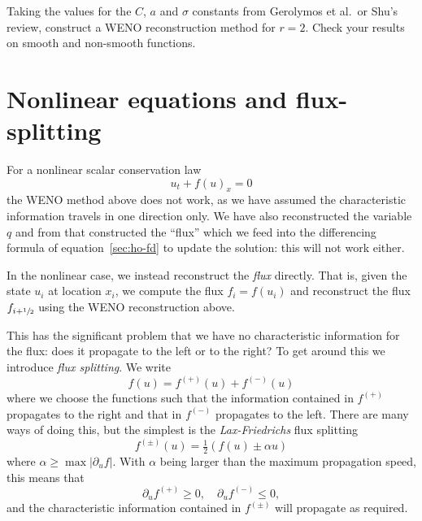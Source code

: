 \begin{exercise}
{Taking the values for the $C$, $a$ and $\sigma$ constants from Gerolymos et
al.\ or Shu's review, construct a WENO reconstruction method for $r=2$. Check
your results on smooth and non-smooth functions.}
\end{exercise}

\section{Nonlinear equations and flux-splitting}


For a nonlinear scalar conservation law
\begin{equation}
  \label{eq:scalar_conslaw}
  u_t + f(u)_x = 0
\end{equation}
the WENO method above does not work, as we have assumed the characteristic
information travels in one direction only. We have also reconstructed the
variable $q$ and from that constructed the ``flux'' which we feed into the
differencing formula of equation~\eqref{sec:ho-fd} to update the solution: this
will not work either.

In the nonlinear case, we instead reconstruct the \emph{flux} directly. That
is, given the state $u_i$ at location $x_i$, we compute the flux $f_i = f(u_i)$
and reconstruct the flux $f_{i+{\sfrac{1}{2}}}$ using the WENO reconstruction above.

This has the significant problem that we have no characteristic information for
the flux: does it propagate to the left or to the right? To get around this we
introduce \emph{flux splitting}. We write
\begin{equation}
  \label{eq:flux-splitting}
  f(u) = f^{(+)}(u) + f^{(-)}(u)
\end{equation}
where we choose the functions such that the information contained in $f^{(+)}$
propagates to the right and that in $f^{(-)}$ propagates to the left. There are
many ways of doing this, but the simplest is the \emph{Lax-Friedrichs} flux
splitting
\begin{equation}
  \label{eq:lf-flux-split}
  f^{(\pm)}(u) = \tfrac{1}{2} \left( f(u) \pm \alpha u \right)
\end{equation}
where $\alpha \ge \max | \partial_u f |$. With $\alpha$ being larger than the maximum propagation speed, this means that
\begin{equation}
  \label{eq:lf-flux-split-speeds}
  \partial_u f^{(+)} \ge 0, \quad \partial_u f^{(-)} \le 0,
\end{equation}
and the characteristic information contained in $f^{(\pm)}$ will propagate as required.

